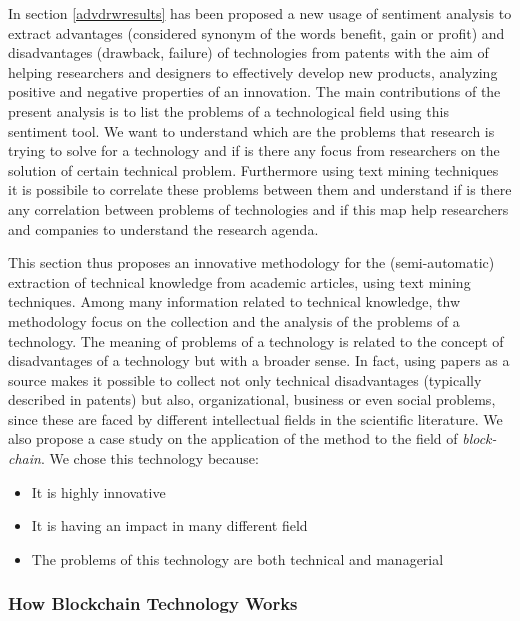 \documentclass[]{book}
\providecommand{\tightlist}{%
  \setlength{\itemsep}{0pt}\setlength{\parskip}{0pt}}
\begin{document}
In section \ref{advdrwresults} has been proposed a new usage of
sentiment analysis to extract advantages (considered synonym of the
words benefit, gain or profit) and disadvantages (drawback, failure) of
technologies from patents with the aim of helping researchers and
designers to effectively develop new products, analyzing positive and
negative properties of an innovation. The main contributions of the
present analysis is to list the problems of a technological field using
this sentiment tool. We want to understand which are the problems that
research is trying to solve for a technology and if is there any focus
from researchers on the solution of certain technical problem.
Furthermore using text mining techniques it is possibile to correlate
these problems between them and understand if is there any correlation
between problems of technologies and if this map help researchers and
companies to understand the research agenda.

This section thus proposes an innovative methodology for the
(semi-automatic) extraction of technical knowledge from academic
articles, using text mining techniques. Among many information related
to technical knowledge, thw methodology focus on the collection and the
analysis of the problems of a technology. The meaning of problems of a
technology is related to the concept of disadvantages of a technology
but with a broader sense. In fact, using papers as a source makes it
possible to collect not only technical disadvantages (typically
described in patents) but also, organizational, business or even social
problems, since these are faced by different intellectual fields in the
scientific literature. We also propose a case study on the application
of the method to the field of \emph{block-chain}. We chose this
technology because:

\begin{itemize}
\tightlist
\item
  It is highly innovative
\item
  It is having an impact in many different field
\item
  The problems of this technology are both technical and managerial
\end{itemize}

\subsubsection*{How Blockchain Technology
Works}\label{how-blockchain-technology-works}
\end{document}
